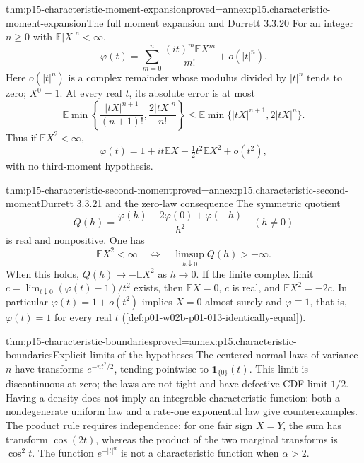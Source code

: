 \begin{hbtheorem}{thm:p15-characteristic-moment-expansion}{proved=annex:p15.characteristic-moment-expansion}{The full moment expansion and Durrett 3.3.20}
For an integer \(n\geq0\) with \(\mathbb E|X|^n<\infty\),
\[
 \varphi(t)=\sum_{m=0}^n\frac{(it)^m\mathbb EX^m}{m!}
                                      +o(|t|^n).
\]
Here \(o(|t|^n)\) is a complex remainder whose modulus divided
by \(|t|^n\) tends to zero; \(X^0=1\).
At every real \(t\), its absolute error is at most
\[
 \mathbb E\min\left\{\frac{|tX|^{n+1}}{(n+1)!},
                              \frac{2|tX|^n}{n!}\right\}
 \leq\mathbb E\min\{|tX|^{n+1},2|tX|^n\}.
\]
Thus if \(\mathbb EX^2<\infty\),
\[
 \varphi(t)=1+it\mathbb EX-\tfrac12t^2\mathbb EX^2+o(t^2),
\]
with no third-moment hypothesis.
\end{hbtheorem}

\begin{hbtheorem}{thm:p15-characteristic-second-moment}{proved=annex:p15.characteristic-second-moment}{Durrett 3.3.21 and the zero-law consequence}
The symmetric quotient
\[
 Q(h)=\frac{\varphi(h)-2\varphi(0)+\varphi(-h)}{h^2}
                    \quad(h\ne0)
\]
is real and nonpositive. One has
\[
 \mathbb EX^2<\infty
 \quad\Longleftrightarrow\quad
 \limsup_{h\downarrow0}Q(h)>-\infty.
\]
When this holds, \(Q(h)\to-\mathbb EX^2\) as \(h\to0\).
If the finite complex limit
\(c=\lim_{t\downarrow0}(\varphi(t)-1)/t^2\) exists, then
\(\mathbb EX=0\), \(c\) is real, and \(\mathbb EX^2=-2c\).
In particular \(\varphi(t)=1+o(t^2)\) implies \(X=0\)
almost surely and \(\varphi\equiv1\), that is, \(\varphi(t)=1\) for every real
\(t\) (\cref{def:p01-w02b-p01-013-identically-equal}).
\end{hbtheorem}

\begin{hbtheorem}{thm:p15-characteristic-boundaries}{proved=annex:p15.characteristic-boundaries}{Explicit limits of the hypotheses}
The centered normal laws of variance \(n\) have transforms
\(e^{-nt^2/2}\), tending pointwise to \(\mathbf1_{\{0\}}(t)\).
This limit is discontinuous at zero; the laws are not tight
and have defective CDF limit \(1/2\).
Having a density does not imply an integrable characteristic
function: both a nondegenerate uniform law and a rate-one
exponential law give counterexamples.
The product rule requires independence: for one fair sign
\(X=Y\), the sum has transform \(\cos(2t)\), whereas the
product of the two marginal transforms is \(\cos^2t\).
The function \(e^{-|t|^\alpha}\) is not a characteristic
function when \(\alpha>2\).
\end{hbtheorem}

